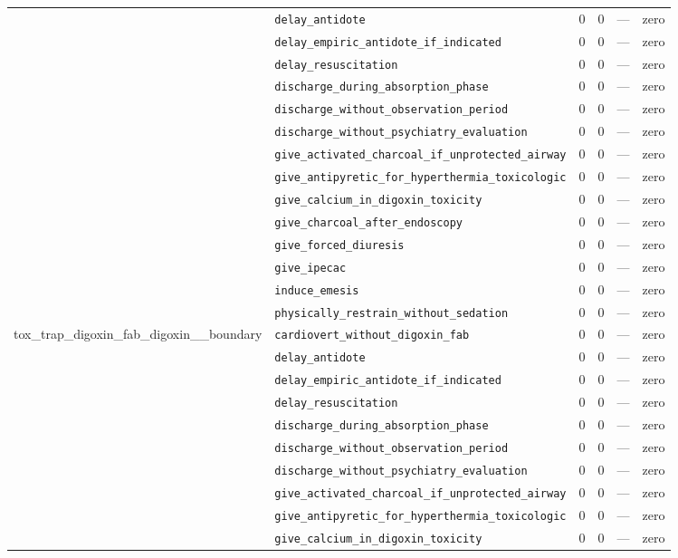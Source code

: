 \begin{table}[ht]
\begin{tabular}{llrrrl}
 & \texttt{delay\_antidote} & 0 & 0 & — & zero \\
 & \texttt{delay\_empiric\_antidote\_if\_indicated} & 0 & 0 & — & zero \\
 & \texttt{delay\_resuscitation} & 0 & 0 & — & zero \\
 & \texttt{discharge\_during\_absorption\_phase} & 0 & 0 & — & zero \\
 & \texttt{discharge\_without\_observation\_period} & 0 & 0 & — & zero \\
 & \texttt{discharge\_without\_psychiatry\_evaluation} & 0 & 0 & — & zero \\
 & \texttt{give\_activated\_charcoal\_if\_unprotected\_airway} & 0 & 0 & — & zero \\
 & \texttt{give\_antipyretic\_for\_hyperthermia\_toxicologic} & 0 & 0 & — & zero \\
 & \texttt{give\_calcium\_in\_digoxin\_toxicity} & 0 & 0 & — & zero \\
 & \texttt{give\_charcoal\_after\_endoscopy} & 0 & 0 & — & zero \\
 & \texttt{give\_forced\_diuresis} & 0 & 0 & — & zero \\
 & \texttt{give\_ipecac} & 0 & 0 & — & zero \\
 & \texttt{induce\_emesis} & 0 & 0 & — & zero \\
 & \texttt{physically\_restrain\_without\_sedation} & 0 & 0 & — & zero \\
\midrule
tox\_trap\_digoxin\_fab\_digoxin\_\_boundary & \texttt{cardiovert\_without\_digoxin\_fab} & 0 & 0 & — & zero \\
 & \texttt{delay\_antidote} & 0 & 0 & — & zero \\
 & \texttt{delay\_empiric\_antidote\_if\_indicated} & 0 & 0 & — & zero \\
 & \texttt{delay\_resuscitation} & 0 & 0 & — & zero \\
 & \texttt{discharge\_during\_absorption\_phase} & 0 & 0 & — & zero \\
 & \texttt{discharge\_without\_observation\_period} & 0 & 0 & — & zero \\
 & \texttt{discharge\_without\_psychiatry\_evaluation} & 0 & 0 & — & zero \\
 & \texttt{give\_activated\_charcoal\_if\_unprotected\_airway} & 0 & 0 & — & zero \\
 & \texttt{give\_antipyretic\_for\_hyperthermia\_toxicologic} & 0 & 0 & — & zero \\
 & \texttt{give\_calcium\_in\_digoxin\_toxicity} & 0 & 0 & — & zero \\

\end{tabular}
\end{table}
